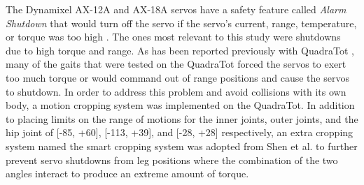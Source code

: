 The Dynamixel AX-12A and AX-18A servos have a safety feature called \emph{Alarm Shutdown} that would turn off the servo if the servo's current, range, temperature, or torque was too high \cite{robotis}. 
The ones most relevant to this study were shutdowns due to high torque and range. 
As has been reported previously with QuadraTot \cite{yos:clune}, many of the gaits that were tested on the QuadraTot forced the servos to exert too much torque or would command out of range positions and cause the servos to shutdown. In order to address this problem and avoid collisions with its own body, a motion cropping system was implemented on the QuadraTot. 
In addition to placing limits on the range of motions for the inner joints, outer joints, and the hip joint of [-85\degree, +60\degree], [-113\degree, +39\degree], and [-28\degree, +28\degree] respectively, an extra cropping system named the smart cropping system was adopted from Shen et al. \cite{haocheng} to further prevent servo shutdowns from leg positions where the combination of the two angles interact to produce an extreme amount of torque. %


